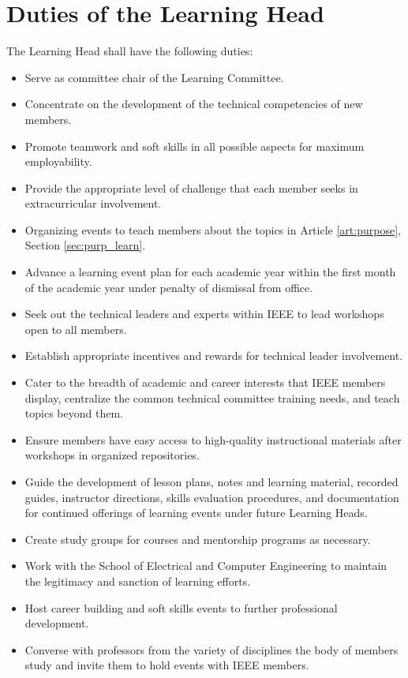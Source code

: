 \documentclass[12pt]{constitution}
\begin{document}
\section{Duties of the Learning Head}
\label{sec:officer_learn}
The Learning Head shall have the following duties:
\begin{itemize}
    \item Serve as committee chair of the Learning Committee.
    \item Concentrate on the development of the technical competencies of new members.
    \item Promote teamwork and soft skills in all possible aspects for maximum employability.
    \item Provide the appropriate level of challenge that each member seeks in extracurricular involvement.
    \item Organizing events to teach members about the topics in Article \ref{art:purpose}, Section \ref{sec:purp_learn}.
    \item Advance a learning event plan for each academic year within the first month of the academic year under penalty of dismissal from office.
    \item Seek out the technical leaders and experts within IEEE to lead workshops open to all members.
    \item Establish appropriate incentives and rewards for technical leader involvement.
    \item Cater to the breadth of academic and career interests that IEEE members display, centralize the common technical committee training needs, and teach topics beyond them.
    \item Ensure members have easy access to high-quality instructional materials after workshops in organized repositories.
    \item Guide the development of lesson plans, notes and learning material, recorded guides, instructor directions, skills evaluation procedures, and documentation for continued offerings of learning events under future Learning Heads.
    \item Create study groups for courses and mentorship programs as necessary.
    \item Work with the School of Electrical and Computer Engineering to maintain the legitimacy and sanction of learning efforts.
    \item Host career building and soft skills events to further professional development.
    \item Converse with professors from the variety of disciplines the body of members study and invite them to hold events with IEEE members.
\end{itemize}
\end{document}
